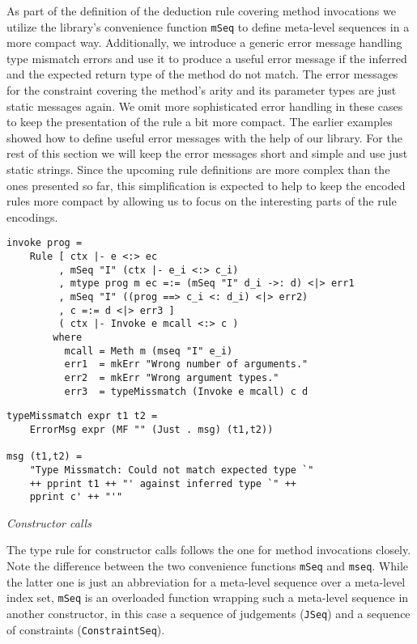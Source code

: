 As part of the definition of the deduction rule covering method
invocations we utilize the library's convenience function \texttt{mSeq}
to define meta-level sequences in a more compact way. Additionally, we
introduce a generic error message handling type mismatch errors and
use it to produce a useful error message if the inferred and the
expected return type of the method do not match. The error messages
for the constraint covering the method's arity and its parameter types
are just static messages again. We omit more sophisticated error
handling in these cases to keep the presentation of the rule a bit
more compact. The earlier examples showed how to define useful error
messages with the help of our library. For the rest of this section we
will keep the error messages short and simple and use just static
strings. Since the upcoming rule definitions are more complex than the
ones presented so far, this simplification is expected to help to keep
the encoded rules more compact by allowing us to focus on the
interesting parts of the rule encodings.

\begin{lstlisting}
invoke prog =
    Rule [ ctx |- e <:> ec
         , mSeq "I" (ctx |- e_i <:> c_i)
         , mtype prog m ec =:= (mSeq "I" d_i ->: d) <|> err1
         , mSeq "I" ((prog ==> c_i <: d_i) <|> err2)
         , c =:= d <|> err3 ]
         ( ctx |- Invoke e mcall <:> c )
        where
          mcall = Meth m (mseq "I" e_i)
          err1  = mkErr "Wrong number of arguments."
          err2  = mkErr "Wrong argument types."
          err3  = typeMissmatch (Invoke e mcall) c d
\end{lstlisting}

\begin{lstlisting}
typeMissmatch expr t1 t2 =
    ErrorMsg expr (MF "" (Just . msg) (t1,t2))
    
msg (t1,t2) =
    "Type Missmatch: Could not match expected type `"
    ++ pprint t1 ++ "' against inferred type `" ++
    pprint c' ++ "'"
\end{lstlisting}

\bigskip\textit{Constructor calls}

\smallskip

The type rule for constructor calls follows the one for method
invocations closely. Note the difference between the two convenience
functions \texttt{mSeq} and \texttt{mseq}. While the latter one is
just an abbreviation for a meta-level sequence over a meta-level index
set, \texttt{mSeq} is an overloaded function wrapping such a
meta-level sequence in another constructor, in this case a sequence of
judgements (\texttt{JSeq}) and a sequence of constraints
(\texttt{ConstraintSeq}).

